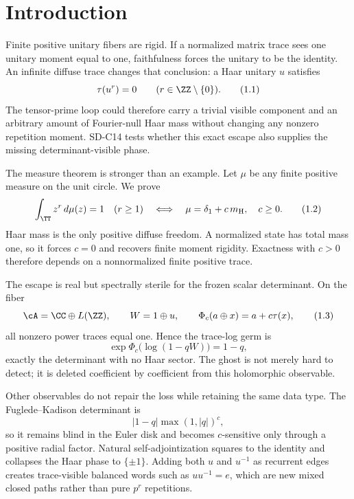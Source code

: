 \section{Introduction}
\label{sec:introduction}

Finite positive unitary fibers are rigid.  If a normalized matrix trace sees
one unitary moment equal to one, faithfulness forces the unitary to be the
identity.  An infinite diffuse trace changes that conclusion: a Haar unitary
$u$ satisfies
\[
 \tau(u^r)=0\qquad(r\in\ZZ\setminus\{0\}).                 \tag{1.1}
\]
The tensor-prime loop could therefore carry a trivial visible component and
an arbitrary amount of Fourier-null Haar mass without changing any nonzero
repetition moment.  SD-C14 tests whether this exact escape also supplies the
missing determinant-visible phase.

The measure theorem is stronger than an example.  Let $\mu$ be any finite
positive measure on the unit circle.  We prove
\[
 \int_\TT z^r\,d\mu(z)=1\quad(r\ge1)
 \quad\Longleftrightarrow\quad
 \mu=\delta_1+c\,m_{\rm H},\quad c\ge0.                  \tag{1.2}
\]
Haar mass is the only positive diffuse freedom.  A normalized state has total
mass one, so it forces $c=0$ and recovers finite moment rigidity.  Exactness
with $c>0$ therefore depends on a nonnormalized finite positive trace.

The escape is real but spectrally sterile for the frozen scalar determinant.
On the fiber
\[
 \cA=\CC\oplus L(\ZZ),\qquad
 W=1\oplus u,\qquad
 \Phi_c(a\oplus x)=a+c\tau(x),                             \tag{1.3}
\]
all nonzero power traces equal one.  Hence the trace-log germ is
\[
 \exp\Phi_c\bigl(\log(1-qW)\bigr)=1-q,                    \tag{1.4}
\]
exactly the determinant with no Haar sector.  The ghost is not merely hard to
detect; it is deleted coefficient by coefficient from this holomorphic
observable.



Other observables do not repair the loss while retaining the same data type.
The Fuglede--Kadison determinant is
\[
 |1-q|\max(1,|q|)^c,                                      \tag{1.5}
\]
so it remains blind in the Euler disk and becomes $c$-sensitive only through
a positive radial factor.  Natural self-adjointization squares to the
identity and collapses the Haar phase to $\{\pm1\}$.  Adding both $u$ and
$u^{-1}$ as recurrent edges creates trace-visible balanced words such as
$uu^{-1}=e$, which are new mixed closed paths rather than pure $p^r$
repetitions.

